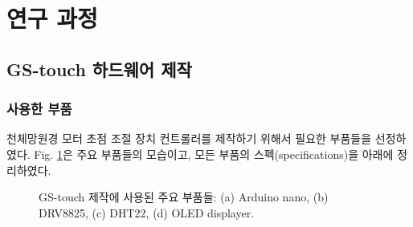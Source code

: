 \section{연구 과정}

\subsection{GS-touch 하드웨어 제작}

\subsubsection{사용한 부품}


천체망원경 모터 초점 조절 장치 컨트롤러를 제작하기 위해서 필요한 부품들을 선정하였다. Fig. \ref{fig:parts}은 주요 부품들의 모습이고, 모든 부품의 스펙(specifications)을 아래에 정리하였다. 

\begin{figure}[h]
	\begin{center}
	\end{center}
	\caption{GS-touch 제작에 사용된 주요 부품들: (a) Arduino nano, (b) DRV8825, (c) DHT22, (d) OLED displayer.}
	\label{fig:parts}
\end{figure}



